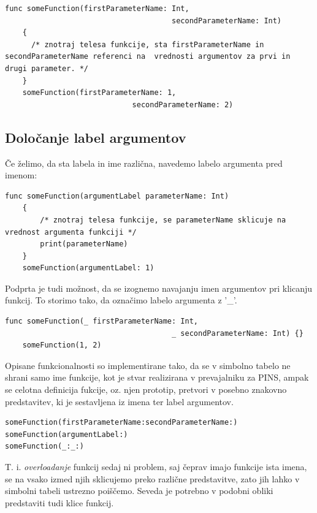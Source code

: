 \documentclass[a4paper, 12p]{book}
\begin{document}
\begin{lstlisting}[caption={Primer definicije in klica funkcije.}, captionpos=b]
	func someFunction(firstParameterName: Int, 
									  secondParameterName: Int) 
	{
	  /* znotraj telesa funkcije, sta firstParameterName in secondParameterName referenci na  vrednosti argumentov za prvi in drugi parameter. */
	}
	someFunction(firstParameterName: 1, 
							 secondParameterName: 2)
\end{lstlisting}

\subsection{Določanje label argumentov}

Če želimo, da sta labela in ime različna, navedemo labelo argumenta pred imenom:

\begin{lstlisting}[caption={Labela argumenta in ime parametra se razlikujeta.}, captionpos=b]
	func someFunction(argumentLabel parameterName: Int) 
	{
		/* znotraj telesa funkcije, se parameterName sklicuje na vrednost argumenta funkciji */
		print(parameterName)
	}
	someFunction(argumentLabel: 1) 
\end{lstlisting}

Podprta je tudi možnost, da se izognemo navajanju imen argumentov pri klicanju funkcij. To storimo tako, da označimo labelo argumenta z '\_'.

\begin{lstlisting}[caption={Klic funkcije brez navedbe imen argumentov.}, captionpos=b]
	func someFunction(_ firstParameterName: Int, 
									  _ secondParameterName: Int) {}
	someFunction(1, 2)
\end{lstlisting}

Opisane funkcionalnosti so implementirane tako, da se v simbolno tabelo ne shrani samo ime funkcije, kot je stvar realizirana v prevajalniku za PINS, ampak se celotna definicija fukcije, oz. njen prototip, pretvori v posebno znakovno predstavitev, ki je sestavljena iz imena ter label argumentov.

\begin{lstlisting}[caption={Znakovne predstavitve funkcij.}, captionpos=b]
someFunction(firstParameterName:secondParameterName:)
someFunction(argumentLabel:)
someFunction(_:_:)
\end{lstlisting}

T. i. \textit{overloadanje} funkcij sedaj ni problem, saj čeprav imajo funkcije ista imena, se na vsako izmed njih sklicujemo preko različne predstavitve, zato jih lahko v simbolni tabeli ustrezno poiščemo. Seveda je potrebno v podobni obliki predstaviti tudi klice funkcij.
\end{document}
